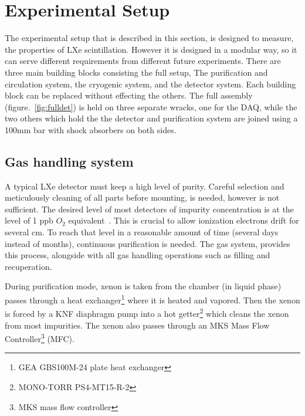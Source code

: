 \section{Experimental Setup}
\label{expSetup}


The experimental setup that is described in this section, is designed to measure, the properties of LXe scintillation. 
However it is designed in a modular way, so it can serve different requirements from different future experiments. 
There are three main building blocks consisting the full setup, The purification and circulation system, the cryogenic 
system, and the detector system. Each building block can be replaced without effecting the others. The full assembly 
(figure.~\ref{fig:fulldet}) is held on three separate wracks, one for the DAQ, while the two others which hold the the 
detector and purification system are joined using a 100mm bar with shock absorbers on both sides.   

\subsection{Gas handling system}
\label{subsec:gas}

A typical LXe detector must keep a high level of purity. Careful selection and meticulously cleaning of all parts before mounting, 
is needed, however is not sufficient. The desired level of most detectors of impurity concentration is at the level of 1 ppb $O_2$ 
equivalent~\cite{Aprile:2009dv}. This is crucial to allow ionization electrons drift for several cm. To reach that level in a 
reasonable amount of time (several days instead of months), continuous purification is needed. The gas system, provides this process, 
alongside with all gas handling operations such as filling and recuperation.

During purification mode, xenon is taken from the chamber (in liquid phase)
passes through a heat exchanger\footnote{GEA GBS100M-24 plate heat exchanger} where it is heated and vapored. Then the xenon is forced 
by a KNF diaphragm pump into a hot getter\footnote{MONO-TORR
PS4-MT15-R-2} which cleans the xenon from most impurities. The xenon
also passes through an MKS Mass Flow Controller\footnote{MKS mass flow controller} (MFC). 

